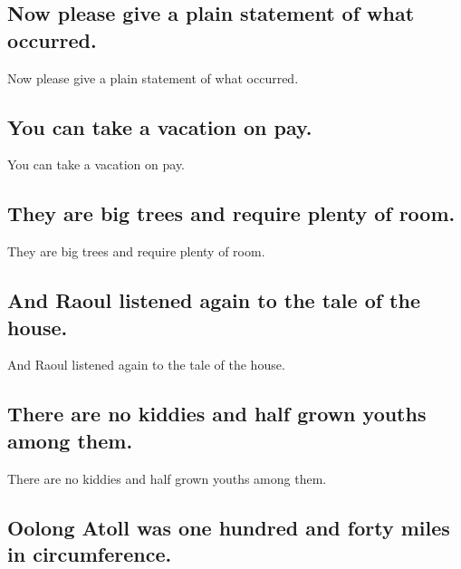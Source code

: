 \documentclass[]{article}
\begin{document}
\hypertarget{now-please-give-a-plain-statement-of-what-occurred.}{%
\subsection{Now please give a plain statement of what
occurred.}\label{now-please-give-a-plain-statement-of-what-occurred.}}

Now please give a plain statement of what occurred.

\hypertarget{you-can-take-a-vacation-on-pay.}{%
\subsection{You can take a vacation on
pay.}\label{you-can-take-a-vacation-on-pay.}}

You can take a vacation on pay.

\hypertarget{they-are-big-trees-and-require-plenty-of-room.}{%
\subsection{They are big trees and require plenty of
room.}\label{they-are-big-trees-and-require-plenty-of-room.}}

They are big trees and require plenty of room.

\hypertarget{and-raoul-listened-again-to-the-tale-of-the-house.}{%
\subsection{And Raoul listened again to the tale of the
house.}\label{and-raoul-listened-again-to-the-tale-of-the-house.}}

And Raoul listened again to the tale of the house.

\hypertarget{there-are-no-kiddies-and-half-grown-youths-among-them.}{%
\subsection{There are no kiddies and half grown youths among
them.}\label{there-are-no-kiddies-and-half-grown-youths-among-them.}}

There are no kiddies and half grown youths among them.

\hypertarget{oolong-atoll-was-one-hundred-and-forty-miles-in-circumference.}{%
\subsection{Oolong Atoll was one hundred and forty miles in
circumference.}\label{oolong-atoll-was-one-hundred-and-forty-miles-in-circumference.}}
\end{document}
